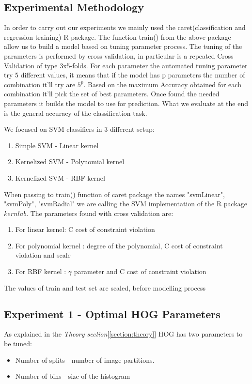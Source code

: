 \subsection{Experimental Methodology}
In order to carry out our experiments we mainly used the caret(classification and regression training) R package\cite{caret}. 
The function train() from the above package allow us to build a model based on tuning parameter process. 
The tuning of the parameters is performed by cross validation, in particular is a repeated Cross Validation of type 3x5-folds. For each parameter the automated tuning parameter try 5 different values, it means that if the model has p parameters the number of combination it'll try are $5^p$. Based on the maximum Accuracy obtained for each combination it'll pick the set of best parameters.
Once found the needed parameters it builds the model to use for prediction. What we evaluate at the end is the general accuracy of the classification task.

We focused on SVM classifiers in 3 different setup: 
\begin{enumerate}
    \item Simple SVM - Linear kernel
    \item Kernelized SVM - Polynomial kernel
    \item Kernelized SVM - RBF kernel
\end{enumerate}

When passing to train() function of caret package the names "svmLinear", "svmPoly", "svmRadial" we are calling the SVM implementation of the R package $kernlab$\cite{Kernelab}. 
The parameters found with cross validation are:
\begin{enumerate}
    \item For linear kernel: C cost of constraint violation
    \item For polynomial kernel : degree of the polynomial, C cost of constraint violation and scale
    \item For RBF kernel : $\gamma$ parameter and C cost of constraint violation
\end{enumerate}
The values of train and test set are scaled, before modelling process

\subsection{Experiment 1 - Optimal HOG Parameters}
As explained in the \textit{Theory section}[\ref{section:theory}] HOG has two parameters to be tuned:
\begin{itemize}
    \item Number of splits -  number of image partitions.
    \item Number of bins - size of the histogram
\end{itemize}

